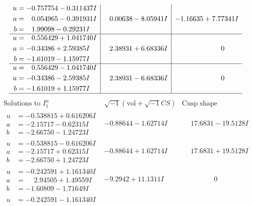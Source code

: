 \documentclass[1p]{elsarticle_modified}
\theoremstyle{definition}
\newcommand{\I}{\sqrt{-1}}
\begin{document}
$$\begin{array}{c|c|c}
\begin{aligned}
u &= -0.757754 - 0.311437 I \\
a &= \phantom{-}0.054965 - 0.391931 I \\
b &= \phantom{-}1.99098 - 0.29231 I\end{aligned}
 & \phantom{-}0.00638 - 8.05941 I & -1.16635 + 7.77341 I \\ \hline\begin{aligned}
u &= \phantom{-}0.556429 + 1.041740 I \\
a &= -0.34386 + 2.59385 I \\
b &= -1.61019 - 1.15977 I\end{aligned}
 & \phantom{-}2.38931 + 6.68336 I & \phantom{-0.000000 } 0 \\ \hline\begin{aligned}
u &= \phantom{-}0.556429 - 1.041740 I \\
a &= -0.34386 - 2.59385 I \\
b &= -1.61019 + 1.15977 I\end{aligned}
 & \phantom{-}2.38931 - 6.68336 I & \phantom{-0.000000 } 0\\
 \hline 
 \end{array}$$\newpage$$\begin{array}{c|c|c}  
\text{Solutions to }I^u_{1}& \I (\text{vol} + \sqrt{-1}CS) & \text{Cusp shape}\\
 \hline 
\begin{aligned}
u &= -0.538815 + 0.616206 I \\
a &= -2.15717 - 0.62315 I \\
b &= -2.66750 - 1.24723 I\end{aligned}
 & -0.88644 - 1.62714 I & \phantom{-}17.6831 - 19.5128 I \\ \hline\begin{aligned}
u &= -0.538815 - 0.616206 I \\
a &= -2.15717 + 0.62315 I \\
b &= -2.66750 + 1.24723 I\end{aligned}
 & -0.88644 + 1.62714 I & \phantom{-}17.6831 + 19.5128 I \\ \hline\begin{aligned}
u &= -0.242591 + 1.161340 I \\
a &= \phantom{-}2.94505 + 1.49559 I \\
b &= -1.60809 - 1.71649 I\end{aligned}
 & -9.2942 + 11.1311 I & \phantom{-0.000000 } 0 \\ \hline\begin{aligned}
u &= -0.242591 - 1.161340 I \\

\end{aligned}
\end{array}$$
\end{document}
